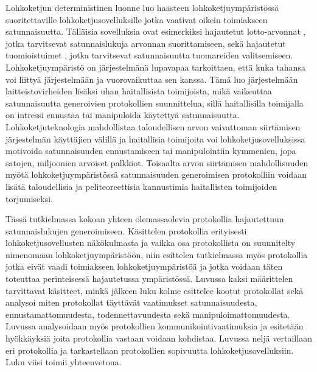 Lohkoketjun deterministinen luonne luo haasteen lohkoketjuympäristössä suoritettaville lohkoketjusovelluksille jotka vaativat oikein toimiakseen satunnaisuutta. Tälläisia sovelluksia ovat esimerkiksi hajautetut lotto-arvonnat \cite{pooltogether_pooltogether_nodate}, jotka tarvitsevat satunnaislukuja arvonnan suorittamiseen, sekä hajautetut tuomioistuimet \cite{lesaege_kleros_2020}, jotka tarvitsevat satunnaisuutta tuomareiden valitsemiseen. Lohkoketjuympäristö on järjestelmänä lupavapaa tarkoittaen, että kuka tahansa voi liittyä järjestelmään ja vuorovaikuttaa sen kanssa. Tämä luo järjestelmään laitteistovirheiden lisäksi uhan haitallisista toimijoista, mikä vaikeuttaa satunnaisuutta generoivien protokollien suunnittelua, sillä haitallisilla toimijalla on intressi ennustaa tai manipuloida käytettyä satunnaisuutta. Lohkoketjuteknologia mahdollistaa taloudellisen arvon vaivattoman siirtämisen järjestelmän käyttäjien välillä ja haitallisia toimijoita voi lohkoketjusovelluksissa motivoida satunnaisuuden ennustamiseen tai manipulointiin kymmenien, jopa satojen, miljoonien arvoiset palkkiot. Toisaalta arvon siirtämisen mahdollisuuden myötä lohkoketjuympäristössä satunnaisuuden generoimisen protokolliin voidaan lisätä taloudellisia ja peliteoreettisia kannustimia haitallisten toimijoiden torjumiseksi.

Tässä tutkielmassa kokoan yhteen olemassaolevia protokollia hajautettuun satunnaislukujen generoimiseen.
Käsittelen protokollia erityisesti lohkoketjusovellusten näkökulmasta ja vaikka osa protokollista on suunnitelty nimenomaan lohkoketjuympäristöön, niin esittelen tutkielmassa myös protokollia jotka eivät vaadi toimiakseen lohkoketjuympäristöä ja jotka voidaan täten toteuttaa perinteisessä hajautetussa ympäristössä. Luvussa kaksi määrittelen tarvittavat käsitteet, minkä jälkeen luku kolme esittelee kootut protokollat sekä analysoi miten protokollat täyttävät vaatimukset satunnaisuudesta, ennustamattomuudesta, todennettavuudesta sekä manipuloimattomuudesta. Luvussa analysoidaan myös protokollien kommunikointivaatimuksia ja esitetään hyökkäyksiä joita protokollia vastaan voidaan kohdistaa. Luvussa neljä vertaillaan eri protokollia ja tarkastellaan protokollien sopivuutta lohkoketjusovelluksiin. Luku viisi toimii yhteenvetona.